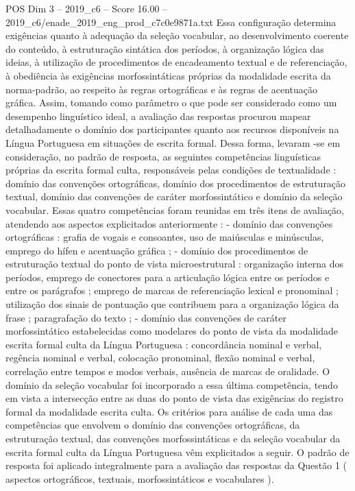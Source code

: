 \begin{textsample}{POS Dim 3 – 2019\_c6 – Score 16.00 – 2019\_c6/enade\_2019\_eng\_prod\_c7c0e9871a.txt}
Essa configuração determina exigências quanto à adequação da seleção vocabular, ao desenvolvimento coerente do conteúdo, à estruturação sintática dos períodos, à organização lógica das ideias, à utilização de procedimentos de encadeamento textual e de referenciação, à obediência às exigências morfossintáticas próprias da modalidade escrita da norma-padrão, ao respeito às regras ortográficas e às regras de acentuação gráfica.
Assim, tomando como parâmetro o que pode ser considerado como um desempenho linguístico ideal, a avaliação das respostas procurou mapear detalhadamente o domínio dos participantes quanto aos recursos disponíveis na Língua Portuguesa em situações de escrita formal.
Dessa forma, levaram -se em consideração, no padrão de resposta, as seguintes competências linguísticas próprias da escrita formal culta, responsáveis pelas condições de textualidade : domínio das convenções ortográficas, domínio dos procedimentos de estruturação textual, domínio das convenções de caráter morfossintático e domínio da seleção vocabular.
Essas quatro competências foram reunidas em três itens de avaliação, atendendo aos aspectos explicitados anteriormente : - domínio das convenções ortográficas : grafia de vogais e consoantes, uso de maiúsculas e minúsculas, emprego do hífen e acentuação gráfica ; - domínio dos procedimentos de estruturação textual do ponto de vista microestrutural : organização interna dos períodos, emprego de conectores para a articulação lógica entre os períodos e entre os parágrafos ; emprego de marcas de referenciação lexical e pronominal ; utilização dos sinais de pontuação que contribuem para a organização lógica da frase ; paragrafação do texto ; - domínio das convenções de caráter morfossintático estabelecidas como modelares do ponto de vista da modalidade escrita formal culta da Língua Portuguesa : concordância nominal e verbal, regência nominal e verbal, colocação pronominal, flexão nominal e verbal, correlação entre tempos e modos verbais, ausência de marcas de oralidade.
O domínio da seleção vocabular foi incorporado a essa última competência, tendo em vista a intersecção entre as duas do ponto de vista das exigências do registro formal da modalidade escrita culta.
Os critérios para análise de cada uma das competências que envolvem o domínio das convenções ortográficas, da estruturação textual, das convenções morfossintáticas e da seleção vocabular da escrita formal culta da Língua Portuguesa vêm explicitados a seguir.
O padrão de resposta foi aplicado integralmente para a avaliação das respostas da Questão 1 ( aspectos ortográficos, textuais, morfossintáticos e vocabulares ).

\end{textsample}
